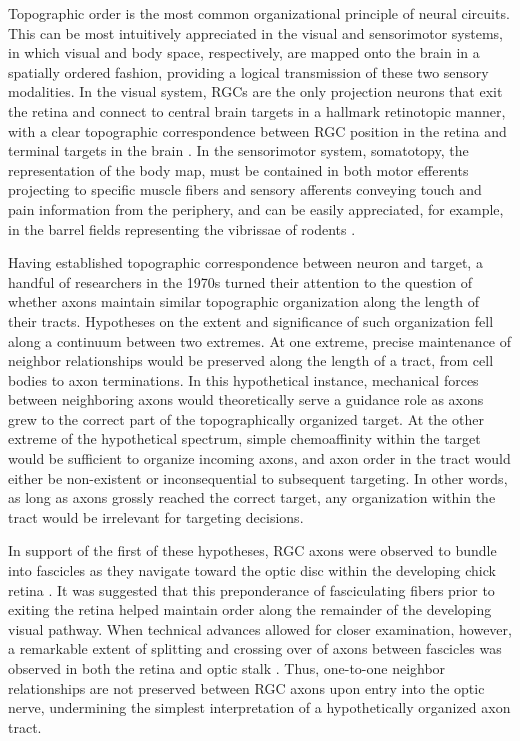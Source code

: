 Topographic order is the most common organizational principle of neural circuits.
This can be most intuitively appreciated in the visual and sensorimotor systems, in which visual and body space, respectively, are mapped onto the brain in a spatially ordered fashion, providing a logical transmission of these two sensory modalities.
In the visual system, RGCs are the only projection neurons that exit the retina and connect to central brain targets in a hallmark retinotopic manner, with a clear topographic correspondence between RGC position in the retina and terminal targets in the brain \cite{lund1974organization}.
In the sensorimotor system, somatotopy, the representation of the body map, must be contained in both motor efferents projecting to specific muscle fibers and sensory afferents conveying touch and pain information from the periphery, and can be easily appreciated, for example, in the barrel fields representing the vibrissae of rodents \cite{woolsey1970structural}.

Having established topographic correspondence between neuron and target, a handful of researchers in the 1970s turned their attention to the question of whether axons maintain similar topographic organization along the length of their tracts.
Hypotheses on the extent and significance of such organization fell along a continuum between two extremes.
At one extreme, precise maintenance of neighbor relationships would be preserved along the length of a tract, from cell bodies to axon terminations.
In this hypothetical instance, mechanical forces between neighboring axons would theoretically serve a guidance role as axons grew to the correct part of the topographically organized target.
At the other extreme of the hypothetical spectrum, simple chemoaffinity within the target would be sufficient to organize incoming axons, and axon order in the tract would either be non-existent or inconsequential to subsequent targeting.
In other words, as long as axons grossly reached the correct target, any organization within the tract would be irrelevant for targeting decisions.

In support of the first of these hypotheses, RGC axons were observed to bundle into fascicles as they navigate toward the optic disc within the developing chick retina \cite{goldberg1972topographical}.
It was suggested that this preponderance of fasciculating fibers prior to exiting the retina helped maintain order along the remainder of the developing visual pathway. 
When technical advances allowed for closer examination, however, a remarkable extent of splitting and crossing over of axons between fascicles was observed in both the retina \cite{simon1991relationship} and optic stalk \cite{simon1991relationship,williams1985dispersion}.
Thus, one-to-one neighbor relationships are not preserved between RGC axons upon entry into the optic nerve, undermining the simplest interpretation of a hypothetically organized axon tract.

